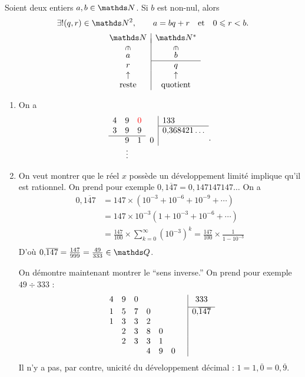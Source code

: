 \begin{thm}
	Soient deux entiers $a,b \in \N$. Si $b$\/ est non-nul, alors \[
		\exists!(q,r) \in \N^2,\qquad a = bq + r\quad\text{et}\quad0\le r < b
	.\]
	\[
		\begin{array}{c|c}
			\N&\N^*\\[-2mm]
			\vrt\in&\vrt\in\\[1mm]
			a&b\\ \cline{2-2}
			r&q\\
			\uparrow&\uparrow\\
			\text{reste}&\text{quotient}\\
		\end{array}
	\]
\end{thm}

\begin{exo}
	\begin{enumerate}
		\item On a \[
				\begin{array}{cccc|l}
					4&9&{\color{red}0}&&133\\\cline{5-5}
					3&9&9&&0{,}368421\ldots\\ \cline{1-3}
					 &9&1&0&\\
					 &\vdots\\
				\end{array}
			.\]
		\item On veut montrer que le réel $x$\/ possède un développement limité implique qu'il est rationnel.
			On prend pour exemple $0{,}\overline{147} = 0{,}147147147\ldots$
			On a
			\begin{align*}
				0{,}\overline{147} &= 147 \times \left( 10^{-3} + 10^{-6} + 10^{-9} + \cdots \right) \\
				&= 147 \times 10^{-3}(1 + 10^{-3} + 10^{-6} + \cdots) \\
				&= \frac{147}{100} \times \sum_{k=0}^\infty (10^{-3})^k = \frac{147}{100} \times \frac{1}{1- 10^{-3}} \\
			\end{align*}
			D'où $0{,}\overline{147} = \frac{147}{999} = \frac{49}{333} \in \Q$.

			On démontre maintenant montrer le ``sens inverse.'' On prend pour exemple $49 \div 333$\/ : \[
				\begin{array}{ccccccc|c}
					4&9&0&&&&&333\\[1mm] \cline{8-8}
					1&5&7&0&&&&0{,}\overline{147}\\
					1&3&3&2&&&\\
					&2&3&8&0&&\\
					&2&3&3&1&&\\
					&&&4&9&0&&\\
				\end{array}
			\]
			Il n'y a pas, par contre, unicité du développement décimal : $1 = 1{,}\overline0 = 0{,}\overline9$.
	\end{enumerate}
\end{exo}

